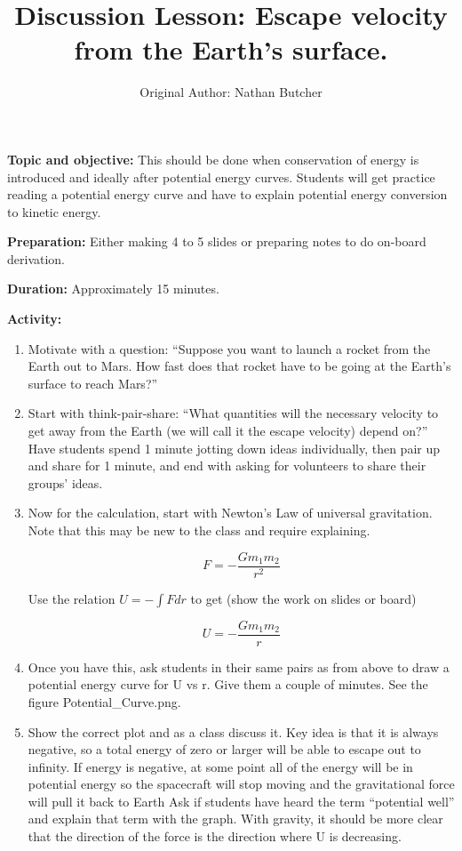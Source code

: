 \documentclass{article}
\title{Discussion Lesson: Escape velocity from the Earth's surface.}
\author{Original Author: Nathan Butcher}
\date{}
\begin{document}
\maketitle

\textbf{Topic and objective:} This should be done when conservation of energy is introduced and ideally after potential energy curves. Students will get practice reading a potential energy curve and have to explain potential energy conversion to kinetic energy.

\textbf{Preparation:} Either making 4 to 5 slides or preparing notes to do on-board derivation. 

\textbf{Duration:} Approximately 15 minutes. 

\hspace{14pt}

\textbf{Activity:}
\begin{enumerate}
\item Motivate with a question: ``Suppose you want to launch a rocket from the Earth out to Mars. How fast does that rocket have to be going at the Earth's surface to reach Mars?''

\item Start with think-pair-share: ``What quantities will the necessary velocity to get away from the Earth (we will call it the escape velocity) depend on?'' Have students spend 1 minute jotting down ideas individually, then pair up and share for 1 minute, and end with asking for volunteers to share their groups' ideas.

\item Now for the calculation, start with Newton's Law of universal gravitation. Note that this may be new to the class and require explaining.

\begin{equation}
F = - \frac{G m_1 m_2}{r^2}
\end{equation}

Use the relation $U = - \int F dr$ to get (show the work on slides or board) 

\begin{equation}
U = - \frac{G m_1 m_2}{r}
\end{equation}

\item Once you have this, ask students in their same pairs as from above to draw a potential energy curve for U vs r. Give them a couple of minutes. See the figure Potential\_Curve.png.

\item Show the correct plot and as a class discuss it. Key idea is that it is always negative, so a total energy of zero or larger will be able to escape out to infinity. If energy is negative, at some point all of the energy will be in potential energy so the spacecraft will stop moving and the gravitational force will pull it back to Earth Ask if students have heard the term ``potential well'' and explain that term with the graph. With gravity, it should be more clear that the direction of the force is the direction where U is decreasing.


\end{enumerate}
\end{document}
